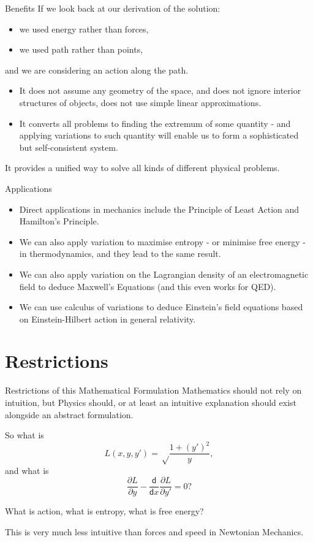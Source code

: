 \documentclass{beamer}
\newcommand{\diff}{\mathsf{d}}
\begin{document}
\begin{frame}{Benefits}
    If we look back at our derivation of the solution: \pause
    \begin{itemize}
        \item we used energy rather than forces, \pause
        \item we used path rather than points, \pause
    \end{itemize}
    and we are considering an action along the path. \pause

    \begin{itemize}
        \item It does not assume any geometry of the space, and does not ignore interior structures of objects, does not use simple linear approximations. \pause
        \item It converts all problems to finding the extremum of some quantity - and applying variations to such quantity will enable us to form a sophisticated but self-consistent system. \pause
    \end{itemize}

    It provides a unified way to solve all kinds of different physical problems.
\end{frame}

\begin{frame}{Applications} \pause
    \begin{itemize}
        \item Direct applications in mechanics include the Principle of Least Action and Hamilton's Principle. \pause
        \item We can also apply variation to maximise entropy - or minimise free energy - in thermodynamics,  and they lead to the same result. \pause
        \item We can also apply variation on the Lagrangian density of an electromagnetic field to deduce Maxwell's Equations (and this even works for QED). \pause
        \item We can use calculus of variations to deduce Einstein's field equations based on Einstein-Hilbert action in general relativity.
    \end{itemize}
\end{frame}

\section{Restrictions}

\begin{frame}{Restrictions of this Mathematical Formulation}
    Mathematics should not rely on intuition, but Physics should, or at least an intuitive explanation should exist alongside an abstract formulation. \pause

    So what is
    \[
        L(x, y, y') = \sqrt \frac{1 + (y')^2}{y},
    \]
    and what is
    \[
        \frac{\partial L}{\partial y} - \frac{\diff}{\diff x}\frac{\partial L}{\partial y'} = 0?
    \] \pause

    What is action, what is entropy, what is free energy? \pause

    This is very much less intuitive than forces and speed in Newtonian Mechanics.
\end{frame}
\end{document}
